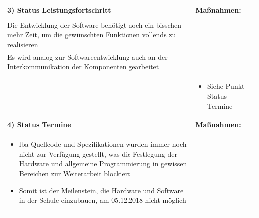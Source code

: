 \begin{center}
\begin{scriptsize}
\begin{tabularx}{\textwidth}{|p{8cm}|X|}
    \textbf{3) Status Leistungsfortschritt} & \textbf{Maßnahmen:}\\
    \begin{minipage}{.55\textwidth} 
    \begin{flushleft}
        \begin{itemize} \vspace{0cm}  
         \item \:[0301], [0302] \\
             Die Entwicklung der Software benötigt noch ein bisschen mehr Zeit, um die gewünschten Funktionen vollends zu realisieren
                 
         \item \:[0305] \\
             Es wird analog zur Softwareentwicklung auch an der Interkommunikation der Komponenten gearbeitet\\
            \vspace{0.2cm}
    \end{itemize}
    \end{flushleft}
    \end{minipage} &
    \begin{minipage}{.4\textwidth} 
    \begin{flushleft}
        \begin{itemize} \vspace{-2.35cm}  
          \item Siehe Punkt Status Termine
    \end{itemize}
    \end{flushleft}
    \end{minipage} \\
    \hline
    \textbf{4) Status Termine} & \textbf{Maßnahmen:}\\
    \begin{minipage}{.56\textwidth} 
    \begin{flushleft}
        \begin{itemize} \vspace{-2.6cm}
        \item \gls{lba}-Quellcode und Spezifikationen wurden immer noch nicht zur Verfügung gestellt, was die Festlegung der Hardware und allgemeine Programmierung in gewissen Bereichen zur Weiterarbeit blockiert
        \item Somit ist der Meilenstein, die Hardware und Software in der Schule einzubauen, am 05.12.2018 nicht möglich
         \vspace{0.2cm}
    \end{itemize}

\end{flushleft}
\end{minipage}
\end{tabularx}
\end{scriptsize}
\end{center}
